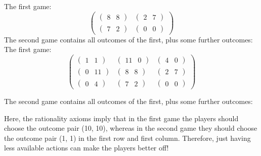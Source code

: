 \begin{example}
    The first game:
    \[\begin{pmatrix}
        \begin{pmatrix} 8 & 8 \end{pmatrix} & \begin{pmatrix} 2 & 7 \end{pmatrix} \\
        \begin{pmatrix} 7 & 2 \end{pmatrix} & \begin{pmatrix} 0 & 0 \end{pmatrix}
    \end{pmatrix}\]
    The second game contains all outcomes of the first, plus some further outcomes:
    The first game:
    \[\begin{pmatrix}
        \begin{pmatrix} 1 & 1 \end{pmatrix} & \begin{pmatrix} 11 & 0 \end{pmatrix} & \begin{pmatrix} 4 & 0 \end{pmatrix} \\
        \begin{pmatrix} 0 & 11 \end{pmatrix} & \begin{pmatrix} 8 & 8 \end{pmatrix} & \begin{pmatrix} 2 & 7 \end{pmatrix} \\
        \begin{pmatrix} 0 & 4 \end{pmatrix} & \begin{pmatrix} 7 & 2 \end{pmatrix} & \begin{pmatrix} 0 & 0 \end{pmatrix}
    \end{pmatrix}\]

    The second game contains all outcomes of the first, plus some further outcomes:

    Here, the rationality axioms imply that in the first game the players should choose the outcome pair (10, 10), whereas in the second game they should choose the outcome pair (1, 1) in the first row and first column.
    Therefore, just having less available actions can make the players better off!


\end{example}


